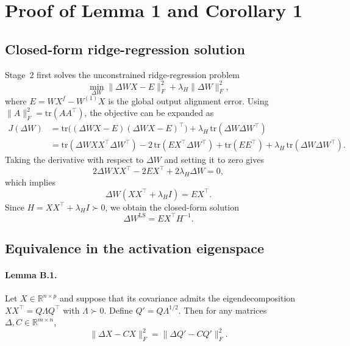 \documentclass[a4paper,fleqn]{cas-dc}
\begin{document}
\section{Proof of Lemma 1 and Corollary 1}

\subsection{Closed-form ridge-regression solution}

Stage~2 first solves the unconstrained ridge-regression problem
\begin{equation}
\min_{\Delta W} \|\Delta W X - E\|_F^2 + \lambda_H \|\Delta W\|_F^2,
\end{equation}
where $E = WX^f - W^{(1)}X$ is the global output alignment error.
Using $\|A\|_F^2 = \mathrm{tr}(AA^{\top})$, the objective can be expanded as
\begin{align}
J(\Delta W)
&= \mathrm{tr}\big((\Delta W X-E)(\Delta W X-E)^{\top}\big) + \lambda_H\,\mathrm{tr}(\Delta W\Delta W^{\top}) \\
&= \mathrm{tr}(\Delta W X X^{\top} \Delta W^{\top}) - 2\,\mathrm{tr}(E X^{\top}\Delta W^{\top}) + \mathrm{tr}(EE^{\top}) + \lambda_H\,\mathrm{tr}(\Delta W\Delta W^{\top}).
\end{align}
Taking the derivative with respect to $\Delta W$ and setting it to zero gives
\begin{equation}
2\Delta W X X^{\top} - 2EX^{\top} + 2\lambda_H \Delta W = 0,
\end{equation}
which implies
\begin{equation}
\Delta W(XX^{\top} + \lambda_H I) = EX^{\top}.
\end{equation}
Since $H = XX^{\top} + \lambda_H I \succ 0$, we obtain the closed-form solution
\begin{equation}
\Delta W^{\mathrm{LS}} = EX^{\top}H^{-1}.
\end{equation}

\subsection{Equivalence in the activation eigenspace}

\paragraph{Lemma B.1.}
Let $X \in \mathbb{R}^{n\times p}$ and suppose that its covariance admits the eigendecomposition $XX^{\top} = Q\Lambda Q^{\top}$ with $\Lambda \succ 0$. Define $Q' = Q\Lambda^{1/2}$. Then for any matrices $\Delta, C \in \mathbb{R}^{m\times n}$,
\begin{equation}
\|\Delta X - CX\|_F^2 = \|\Delta Q' - CQ'\|_F^2.
\end{equation}
\end{document}
